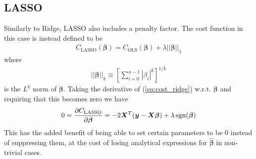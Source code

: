 \documentclass[%
reprint,
amsmath,amssymb,
aps,
pra,
]{revtex4-2}
\begin{document}
\subsection{LASSO}	\label{sec:THEORY_LASSO}
Similarly to Ridge, LASSO also includes a penalty factor. The cost function in this case is instead defined to be
\begin{align}
	C_\text{LASSO}(\bm\beta)=C_\text{OLS}(\bm\beta)+\lambda||\bm\beta||_1
	\label{eq:cost_lasso}
\end{align}
where
\begin{align*}
	||\bm\beta||_k\equiv\left[\sum_{i=0}^{n-1}|\beta_i|^k\right]^{1/k}
\end{align*}
is the $L^k$ norm of $\bm\beta$. Taking the derivative of (\ref{eq:cost_ridge}) w.r.t. $\bm \beta$ and requiring that this becomes zero we have
\begin{align}
	0=\pdv{C_\text{LASSO}}{\bm\beta}=-2\bm X^T(\bm y-\bm X\bm\beta)+\lambda\,\text{sgn}(\bm\beta)
\end{align}
This has the added benefit of being able to set certain parameters to be $0$ instead of suppressing them, at the cost of losing analytical expressions for $\hat{\bm\beta}$ in non-trivial cases.
\end{document}
